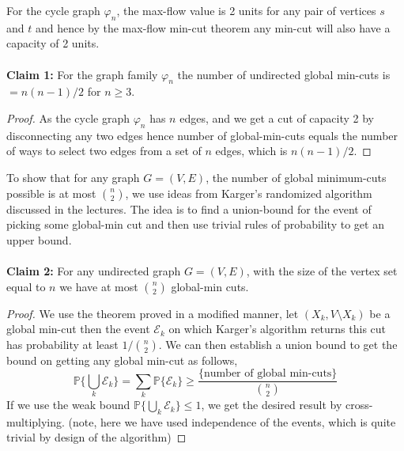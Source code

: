\documentclass{article}
\numberwithin{equation}{section}
\begin{document}
For the cycle graph $\varphi_n$, the max-flow value is 2 units for any pair of vertices $s$ and $t$ and hence by the max-flow min-cut theorem any min-cut will also have  a capacity of 2 units.\\\\
\textbf{Claim 1:} For the graph family $\varphi_{n}$ the number of undirected global min-cuts is $ = n(n-1)/2$ for $n\ge 3$. 
\begin{proof}
    As the cycle graph $\varphi_n$ has $n$ edges, and we get a cut of capacity 2 by disconnecting any two edges hence number of global-min-cuts equals the number of ways to select two edges from a set of $n$ edges, which is $n(n-1)/2$. 
\end{proof}
To show that for any graph $G = (V, E)$, the number of global minimum-cuts possible is at most $\binom{n}{2}$, we use ideas from Karger's randomized algorithm discussed in the lectures. The idea is to find a union-bound for the event of picking some global-min cut and then use trivial rules of probability to get an upper bound.\\\\
\textbf{Claim 2:} For any undirected graph $G = (V, E)$, with the size of the vertex set equal to $n$ we have at most $\binom{n}{2}$ global-min cuts. 
\begin{proof}
   We use the theorem proved in a modified manner, let $(X_k, V\setminus X_k)$ be a global min-cut then the event $\mathcal{E}_k$ on which Karger's algorithm returns this cut has probability at least $1/\binom{n}{2}$. We can then establish a union bound to get the bound on getting any global min-cut as follows, 
   \begin{equation}
       \label{e1}
       \mathbb{P}\biggl\{\bigcup_{k} \mathcal{E}_k\biggr\} = \sum_{k} \mathbb{P}\{\mathcal{E}_k\} \ge \frac{\{\text{number of global min-cuts}\}}{\binom{n}{2}}
   \end{equation}
   If we use the weak bound $\mathbb{P}\{\bigcup_{k} \mathcal{E}_k\} \le 1$, we get the desired result by cross-multiplying. (note, here we have used independence of the events, which is quite trivial by design of the algorithm) 
\end{proof}
\newpage
\end{document}
